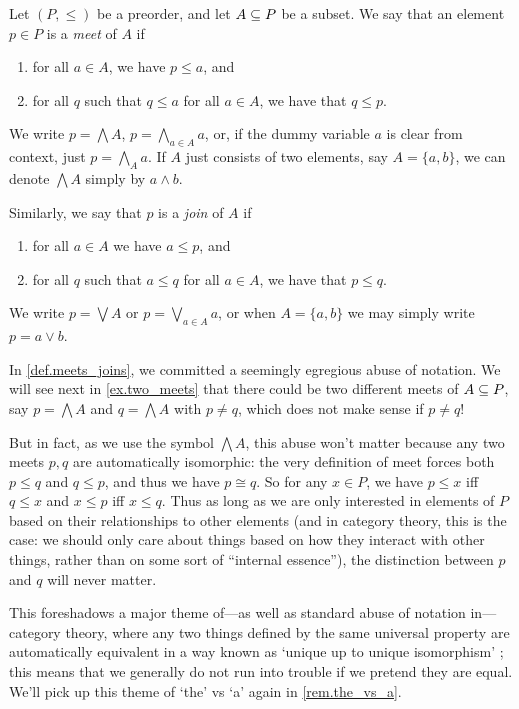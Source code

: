 \documentclass[7Sketches]{subfiles}
\begin{document}
\begin{definition}%
\label{def.meets_joins}%
%
  Let $(P,\le)$ be a preorder, and let $A\ss P$ be a subset. We say that an
  element $p \in P$ is a \emph{meet} of $A$ if 
  \begin{enumerate}[label=(\alph*)]
    \item for all $a \in A$, we have $p \le a$, and 
    \item for all $q$ such that $q \le a$ for all $a \in A$, we have that $q \le p$. 
  \end{enumerate} 
  We write $p = \bigwedge A$, $p=\bigwedge_{a\in A}a$, or, if the dummy variable $a$ is clear from context, just $p=\bigwedge_A a$. If $A$ just consists
  of two elements, say $A=\{a, b\}$, we can denote $\bigwedge A$ simply by $a
  \wedge b$.%

  Similarly, we say that $p$ is a \emph{join} of $A$ if
  \begin{enumerate}[label=(\alph*)]
  	\item for all $a \in A$ we have $a \le p$, and
		\item for all $q$ such that $a \le q$ for all $a
\in A$, we have that $p \le q$.
	\end{enumerate}
	We write $p = \bigvee A$ or $p=\bigvee_{a\in A}a$, or when $A =\{a,b\}$ we may simply write $p=a\vee b$.
\end{definition}

\begin{remark}%
\label{rem.meet_abuse}
In \cref{def.meets_joins}, we committed a seemingly egregious abuse of notation. We will see next in \cref{ex.two_meets} that there could be two different meets of $A\ss P$, say $p=\bigwedge A$ and $q=\bigwedge A$ with $p\neq q$, which does not make sense if $p\neq q$!

But in fact, as we use the symbol $\bigwedge A$, this abuse won't matter
because any two meets $p,q$ are automatically isomorphic: the very definition
of meet forces both $p\leq q$ and $q\leq p$, and thus we have $p\cong q$. So
for any $x\in P$, we have $p\leq x$ iff $q\leq x$ and $x\leq p$ iff $x\leq q$.
Thus as long as we are only interested in elements of $P$ based on their
relationships to other elements (and in category theory, this is the case: we
should only care about things based on how they interact with other things,
rather than on some sort of ``internal essence''), the distinction between $p$
and $q$ will never matter.
    
This foreshadows a major theme of---as well as standard abuse of notation
in---category theory, where any two things defined by the same universal
property are automatically equivalent in a way known as `unique up to unique
isomorphism'%
; this means that we
generally do not run into trouble if we pretend they are equal. We'll pick up
this theme of `the' vs `a' again in \cref{rem.the_vs_a}.
\end{remark}
\end{document}
